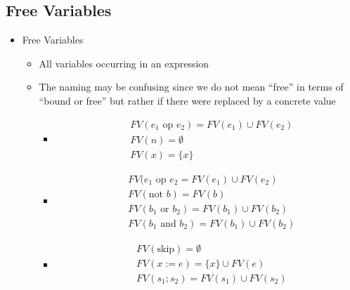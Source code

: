 \subsection{Free Variables}
\begin{itemize}
    \item Free Variables
        \begin{itemize}
            \item All variables occurring in an expression
            \item The naming may be confusing since we do not mean ``free'' in terms of ``bound or free'' but rather if there were replaced by a concrete value
                \begin{itemize}
                    \item
                        \begin{align*}
                            &FV(e_1 \text{ op } e_2) = FV(e_1) \cup FV(e_2)\\
                            &FV(n) = \emptyset\\
                            &FV(x) = \{x\}
                        \end{align*}
                \end{itemize}
                \begin{itemize}
                    \item
                        \begin{align*}
                            &FV(e_1 \text{ op } e_2 = FV(e_1)  \cup FV(e_2)\\
                            &FV(\text{not } b) = FV(b)\\
                            &FV(b_1 \text{ or } b_2) = FV(b_1) \cup FV(b_2)\\
                            &FV(b_1 \text{ and } b_2) = FV(b_1) \cup FV(b_2)
                        \end{align*}
                \end{itemize}
                \begin{itemize}
                    \item
                        \begin{align*}
                            &FV(\text{skip}) = \emptyset\\
                            &FV(x:= e) = \{x\} \cup FV(e)\\
                            &FV(s_1; s_2) = FV(s_1) \cup FV(s_2)\\

\end{align*}
\end{itemize}
\end{itemize}
\end{itemize}
